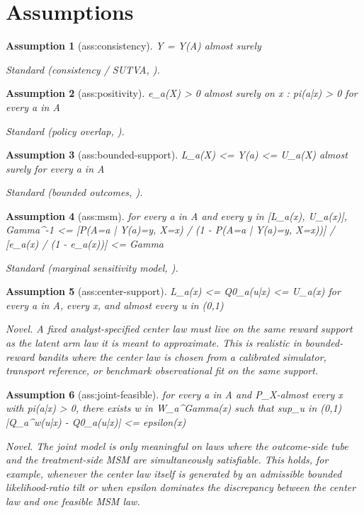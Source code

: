 \documentclass{article}
\newtheorem{assumption}{Assumption}
\begin{document}
\section{Assumptions}

\begin{assumption}[ass:consistency]\label{ass:consistency}
Y = Y(A) almost surely
\par\smallskip\noindent\emph{Standard} (consistency / SUTVA, \cite{ImbensRubin2015}).
\end{assumption}

\begin{assumption}[ass:positivity]\label{ass:positivity}
e_a(X) > 0 almost surely on {x : pi(a|x) > 0} for every a in A
\par\smallskip\noindent\emph{Standard} (policy overlap, \cite{AtheyWager2021}).
\end{assumption}

\begin{assumption}[ass:bounded-support]\label{ass:bounded-support}
L_a(X) <= Y(a) <= U_a(X) almost surely for every a in A
\par\smallskip\noindent\emph{Standard} (bounded outcomes, \cite{Manski1990}).
\end{assumption}

\begin{assumption}[ass:msm]\label{ass:msm}
for every a in A and every y in [L_a(x), U_a(x)], Gamma^{-1} <= [P(A=a | Y(a)=y, X=x) / (1 - P(A=a | Y(a)=y, X=x))] / [e_a(x) / (1 - e_a(x))] <= Gamma
\par\smallskip\noindent\emph{Standard} (marginal sensitivity model, \cite{Tan2006}).
\end{assumption}

\begin{assumption}[ass:center-support]\label{ass:center-support}
L_a(x) <= Q0_a(u|x) <= U_a(x) for every a in A, every x, and almost every u in (0,1)
\par\smallskip\noindent\emph{Novel.} A fixed analyst-specified center law must live on the same reward support as the latent arm law it is meant to approximate. This is realistic in bounded-reward bandits where the center law is chosen from a calibrated simulator, transport reference, or benchmark observational fit on the same support.
\end{assumption}

\begin{assumption}[ass:joint-feasible]\label{ass:joint-feasible}
for every a in A and P_X-almost every x with pi(a|x) > 0, there exists w in W_a^Gamma(x) such that sup_{u in (0,1)} |Q_a^w(u|x) - Q0_a(u|x)| <= epsilon(x)
\par\smallskip\noindent\emph{Novel.} The joint model is only meaningful on laws where the outcome-side tube and the treatment-side MSM are simultaneously satisfiable. This holds, for example, whenever the center law itself is generated by an admissible bounded likelihood-ratio tilt or when epsilon dominates the discrepancy between the center law and one feasible MSM law.
\end{assumption}
\end{document}
